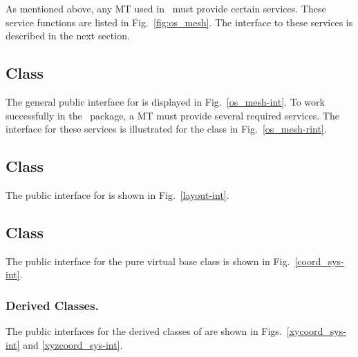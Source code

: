 As mentioned above, any MT used in \imctest\ must provide certain
services.  These service functions are listed in
Fig.~\ref{fig:os_mesh}.  The  interface to these
services is described in the next section.

\subsection{ Class}

The general public interface for  is displayed in
Fig.~\ref{os_mesh-int}.    To work successfully in the
\imctest\ package, a MT must provide several required services.  The
interface for these services is illustrated for the 
class in Fig.~\ref{os_mesh-rint}.

\subsection{ Class}

The public interface for  is shown in
Fig.~\ref{layout-int}.

\subsection{ Class}

The public interface for the pure virtual base class 
is shown in Fig.~\ref{coord_sys-int}.

\subsubsection{ Derived Classes.}

The public interfaces for the derived classes of  are 
shown in Figs.~\ref{xycoord_sys-int} and \ref{xyzcoord_sys-int}.
